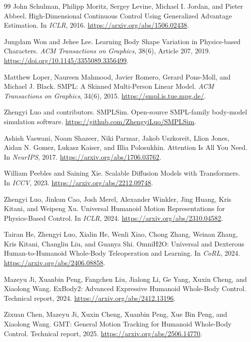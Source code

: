 \begin{thebibliography}{99}
John Schulman, Philipp Moritz, Sergey Levine, Michael I. Jordan,
and Pieter Abbeel.
High-Dimensional Continuous Control Using Generalized Advantage Estimation.
In \emph{ICLR}, 2016.
\url{https://arxiv.org/abs/1506.02438}.

Jungdam Won and Jehee Lee.
Learning Body Shape Variation in Physics-based Characters.
\emph{ACM Transactions on Graphics}, 38(6), Article 207, 2019.
\url{https://doi.org/10.1145/3355089.3356499}.

Matthew Loper, Naureen Mahmood, Javier Romero, Gerard Pons-Moll,
and Michael J. Black.
SMPL: A Skinned Multi-Person Linear Model.
\emph{ACM Transactions on Graphics}, 34(6), 2015.
\url{https://smpl.is.tue.mpg.de/}.

Zhengyi Luo and contributors.
SMPLSim.
Open-source SMPL-family body-model simulation software.
\url{https://github.com/ZhengyiLuo/SMPLSim}.

Ashish Vaswani, Noam Shazeer, Niki Parmar, Jakob Uszkoreit, Llion Jones,
Aidan N. Gomez, Lukasz Kaiser, and Illia Polosukhin.
Attention Is All You Need.
In \emph{NeurIPS}, 2017.
\url{https://arxiv.org/abs/1706.03762}.

William Peebles and Saining Xie.
Scalable Diffusion Models with Transformers.
In \emph{ICCV}, 2023.
\url{https://arxiv.org/abs/2212.09748}.

Zhengyi Luo, Jinkun Cao, Josh Merel, Alexander Winkler, Jing Huang,
Kris Kitani, and Weipeng Xu.
Universal Humanoid Motion Representations for Physics-Based Control.
In \emph{ICLR}, 2024.
\url{https://arxiv.org/abs/2310.04582}.

Tairan He, Zhengyi Luo, Xialin He, Wenli Xiao, Chong Zhang, Weinan Zhang,
Kris Kitani, Changliu Liu, and Guanya Shi.
OmniH2O: Universal and Dexterous Human-to-Humanoid Whole-Body
Teleoperation and Learning.
In \emph{CoRL}, 2024.
\url{https://arxiv.org/abs/2406.08858}.

Mazeyu Ji, Xuanbin Peng, Fangchen Liu, Jialong Li, Ge Yang, Xuxin Cheng,
and Xiaolong Wang.
ExBody2: Advanced Expressive Humanoid Whole-Body Control.
Technical report, 2024.
\url{https://arxiv.org/abs/2412.13196}.

Zixuan Chen, Mazeyu Ji, Xuxin Cheng, Xuanbin Peng, Xue Bin Peng,
and Xiaolong Wang.
GMT: General Motion Tracking for Humanoid Whole-Body Control.
Technical report, 2025.
\url{https://arxiv.org/abs/2506.14770}.


\end{thebibliography}
